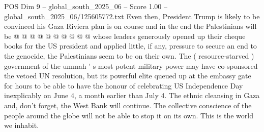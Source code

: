 \begin{textsample}{POS Dim 9 – global\_south\_2025\_06 – Score 1.00 – global\_south\_2025\_06/125605772.txt}
Even then, President Trump is likely to be convinced his Gaza Riviera plan is on course and in the end the Palestinians will be @ @ @ @ @ @ @ @ @ @ whose leaders generously opened up their cheque books for the US president and applied little, if any, pressure to secure an end to the genocide, the Palestinians seem to be on their own.
The ( resource-starved ) government of the ummah ' s most potent military power may have co-sponsored the vetoed UN resolution, but its powerful elite queued up at the embassy gate for hours to be able to have the honour of celebrating US Independence Day inexplicably on June 4, a month earlier than July 4.
The ethnic cleansing in Gaza and, don't forget, the West Bank will continue.
The collective conscience of the people around the globe will not be able to stop it on its own.
This is the world we inhabit.

\end{textsample}
